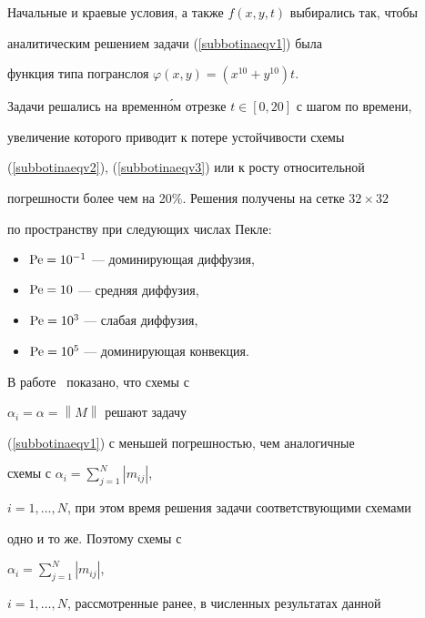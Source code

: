 \medskip





Начальные и краевые условия, а также $f(x,y,t)$ выбирались так, чтобы 


аналитическим решением задачи (\ref{subbotinaeqv1}) была


функция типа погранслоя $\varphi(x,y)=\left(x^{10}+y^{10} \right) t$.





Задачи решались на временн\'ом отрезке $t \in [0,20]$ с шагом по времени, 


увеличение которого приводит к потере устойчивости схемы


(\ref{subbotinaeqv2}), (\ref{subbotinaeqv3}) или к росту относительной 


погрешности более чем на 20\%. Решения получены на сетке $32 \times 32$


по пространству при следующих числах Пекле:


\begin{itemize}


\item[1.] $\operatorname{Pe}=10^{-1}$ --- доминирующая диффузия,


\item[2.] $\operatorname{Pe}=10$ --- средняя диффузия,


\item[3.] $\operatorname{Pe}=10^3$ --- слабая диффузия,


\item[4.] $\operatorname{Pe}=10^5$ --- доминирующая конвекция.


\end{itemize}





В работе~\cite{subbotinabib14} показано, что схемы с


$\alpha _i =\alpha =\left\| M \right\|$ решают задачу


(\ref{subbotinaeqv1}) с меньшей погрешностью, чем аналогичные 


схемы с $\alpha _i =\sum\limits_{j=1}^N {\left| {m_{ij} }\right|}$,


$i=1,\dotsc,N$, при этом время решения задачи соответствующими схемами 


одно и то же. Поэтому схемы с


$\alpha _i =\sum\limits_{j=1}^N {\left| {m_{ij} }\right|}$,


$i=1,\dotsc,N$, рассмотренные ранее, в численных результатах данной 


